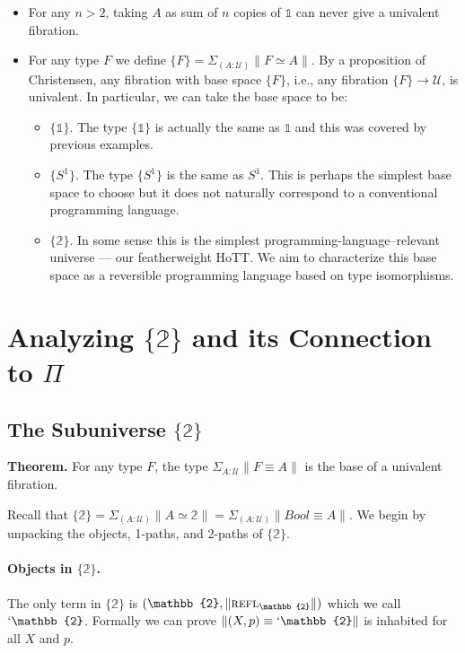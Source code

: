 \documentclass{entcs}
\newcommand{\reflp}{\textsc{refl}}
\newcommand{\ot}{\mathbb{1}}
\newcommand{\bt}{\mathbb{2}}
\begin{document}
\begin{itemize}
\item For any $n > 2$, taking $A$ as sum of $n$ copies of $\ot$ can never
  give a univalent fibration.

\item For any type $F$ we define
  $\{F\} = \Sigma_{(A : \mathcal{U})} \| F \simeq A \|$. By a proposition of
  Christensen, any fibration with base space $\{F\}$, i.e., any fibration
  $\{F\} \to \mathcal{U}$, is univalent. In particular, we can take the base
  space to be:
  \begin{itemize}
  \item $\{\ot\}$. The type $\{\ot\}$ is actually the same as $\ot$ and this was
    covered by previous examples.
  \item $\{S^1\}$. The type $\{S^1\}$ is the same as $S^1$. This is perhaps the
    simplest base space to choose but it does not naturally correspond to a
    conventional programming language.
  \item $\{\bt\}$. In some sense this is the simplest
    programming-language--relevant universe --- our featherweight HoTT. We aim
    to characterize this base space as a reversible programming language based
    on type isomorphisms.
  \end{itemize}

\end{itemize}

\section{Analyzing $\{\bt\}$ and its Connection to $\Pi$}

\subsection{The Subuniverse $\{\bt\}$}

\textbf{Theorem.} For any type $F$, the type $\Sigma_{A:\mathcal{U}} \| F \equiv A \|$ is the base
of a univalent fibration.


Recall that
$\{\bt\} = \Sigma_{(A:\mathcal{U})} \|A \simeq \bt\| = \Sigma_{(A:\mathcal{U})}
\| \mathit{Bool} \equiv A\|$. We begin by unpacking the objects, 1-paths, and 2-paths of
$\{\bt\}$.

\paragraph*{Objects in $\{\bt\}$.} The only term in $\{\bt\}$ is
$(\bt,\|\reflp_{\bt}\|)$ which we call $`\bt$. Formally we can prove
$\|(X,p) \equiv `\bt\|$ is inhabited for all $X$ and $p$.
\end{document}
